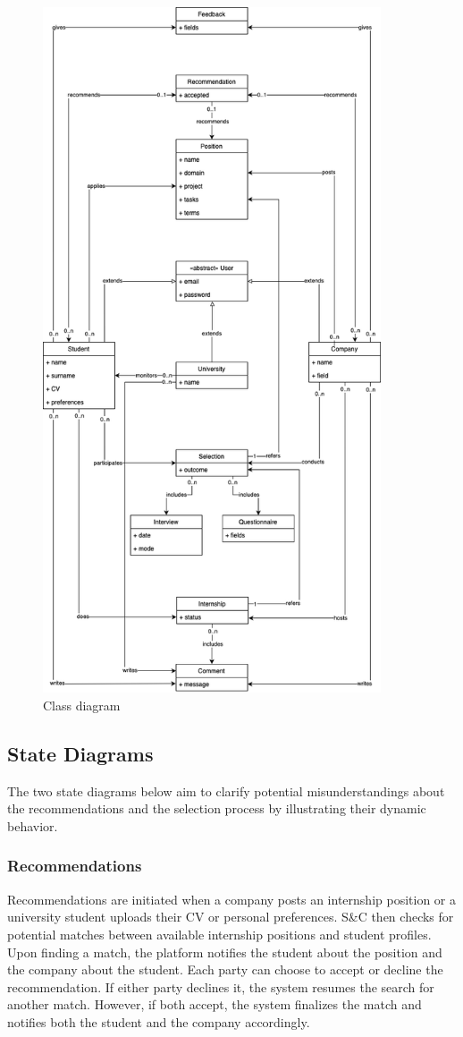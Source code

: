 \begin{figure}
    \centering
    \includegraphics[width=10cm]{images/class-diagram.png}
    \caption{Class diagram}
\end{figure}

\subsection{State Diagrams}
The two state diagrams below aim to clarify potential misunderstandings about the recommendations and the selection process by illustrating their dynamic behavior.

\subsubsection{Recommendations}
Recommendations are initiated when a company posts an internship position or a university student uploads their CV or personal preferences.
S\&C then checks for potential matches between available internship positions and student profiles.
Upon finding a match, the platform notifies the student about the position and the company about the student.
Each party can choose to accept or decline the recommendation.
If either party declines it, the system resumes the search for another match.
However, if both accept, the system finalizes the match and notifies both the student and the company accordingly.

